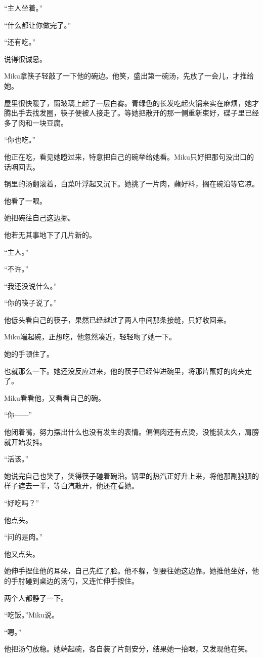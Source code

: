 “主人坐着。”

“什么都让你做完了。”

“还有吃。”

说得很诚恳。

Miku拿筷子轻敲了一下他的碗边。他笑，盛出第一碗汤，先放了一会儿，才推给她。

屋里很快暖了，窗玻璃上起了一层白雾。青绿色的长发吃起火锅来实在麻烦，她才腾出手去找发圈，筷子便被人接走了。等她把散开的那一侧重新束好，碟子里已经多了肉和一块豆腐。

“你也吃。”

他正在吃，看见她瞪过来，特意把自己的碗举给她看。Miku只好把那句没出口的话咽回去。

锅里的汤翻滚着，白菜叶浮起又沉下。她挑了一片肉，蘸好料，搁在碗沿等它凉。

他看了一眼。

她把碗往自己这边挪。

他若无其事地下了几片新的。

“主人。”

“不许。”

“我还没说什么。”

“你的筷子说了。”

他低头看自己的筷子，果然已经越过了两人中间那条接缝，只好收回来。

Miku端起碗，正想吃，他忽然凑近，轻轻吻了她一下。

她的手顿住了。

也就那么一下。她还没反应过来，他的筷子已经伸进碗里，将那片蘸好的肉夹走了。

Miku看看他，又看看自己的碗。

“你——”

他闭着嘴，努力摆出什么也没有发生的表情。偏偏肉还有点烫，没能装太久，肩膀就开始发抖。

“活该。”

她说完自己也笑了，笑得筷子碰着碗沿。锅里的热汽正好升上来，将他那副狼狈的样子遮去一半，等白汽散开，他还在看她。

“好吃吗？”

他点头。

“问的是肉。”

他又点头。

她伸手捏住他的耳朵，自己先红了脸。他不躲，倒要往她这边靠。她推他坐好，他的手肘碰到桌边的汤勺，又连忙伸手按住。

两个人都静了一下。

“吃饭。”Miku说。

“嗯。”

他把汤勺放稳。她端起碗，各自装了片刻安分，结果她一抬眼，又发现他在笑。

